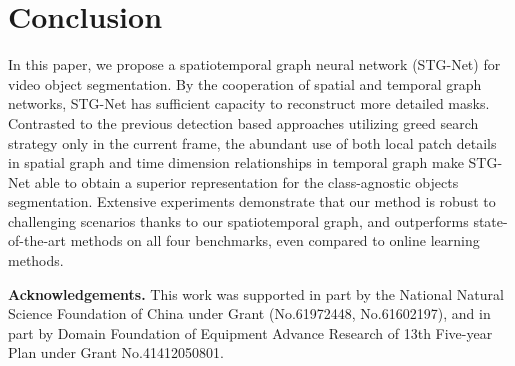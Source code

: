 \documentclass[letterpaper]{article} %
\begin{document}
\section{Conclusion}
In this paper, we propose a spatiotemporal graph neural network (STG-Net) for video object segmentation.
By the cooperation of spatial and temporal graph networks, STG-Net has sufficient capacity to reconstruct more detailed masks.
Contrasted to the previous detection based approaches utilizing greed search strategy only in the current frame, the abundant use of both local patch details in spatial graph and time dimension relationships in temporal graph make STG-Net able to obtain a superior representation for the class-agnostic objects segmentation.
Extensive experiments demonstrate that our method is robust to challenging scenarios thanks to our spatiotemporal graph, and outperforms state-of-the-art methods on all four benchmarks, even compared to online learning methods.

\clearpage
\noindent \textbf{Acknowledgements.} This work was supported in part by the National Natural Science Foundation of China under Grant (No.61972448, No.61602197), and in part by Domain Foundation of Equipment Advance Research of 13th Five-year Plan under Grant No.41412050801.


% 
\end{document}
